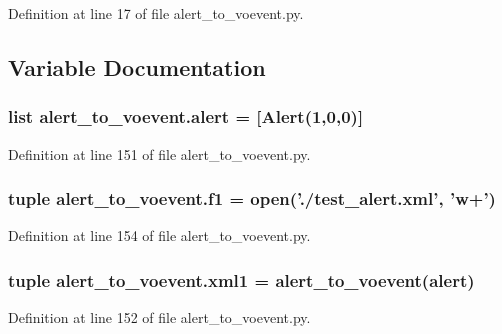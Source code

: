 Definition at line 17 of file alert\-\_\-to\-\_\-voevent.\-py.



\subsection{Variable Documentation}
\hypertarget{namespacealert__to__voevent_a4f4d8458b2c52fe0aa899e49fe69f9db}{
\subsubsection[{alert}]{\setlength{\rightskip}{0pt plus 5cm}list alert\-\_\-to\-\_\-voevent.\-alert = \mbox{[}Alert(1,0,0)\mbox{]}}}\label{namespacealert__to__voevent_a4f4d8458b2c52fe0aa899e49fe69f9db}


Definition at line 151 of file alert\-\_\-to\-\_\-voevent.\-py.

\hypertarget{namespacealert__to__voevent_ad16a5fe14209236bf0dec996bd4d8031}{
\subsubsection[{f1}]{\setlength{\rightskip}{0pt plus 5cm}tuple alert\-\_\-to\-\_\-voevent.\-f1 = open('./test\-\_\-alert.\-xml', 'w+')}}\label{namespacealert__to__voevent_ad16a5fe14209236bf0dec996bd4d8031}


Definition at line 154 of file alert\-\_\-to\-\_\-voevent.\-py.

\hypertarget{namespacealert__to__voevent_ac245971d0da32191244c1bff1550382c}{
\subsubsection[{xml1}]{\setlength{\rightskip}{0pt plus 5cm}tuple alert\-\_\-to\-\_\-voevent.\-xml1 = {\bf alert\-\_\-to\-\_\-voevent}({\bf alert})}}\label{namespacealert__to__voevent_ac245971d0da32191244c1bff1550382c}


Definition at line 152 of file alert\-\_\-to\-\_\-voevent.\-py.

